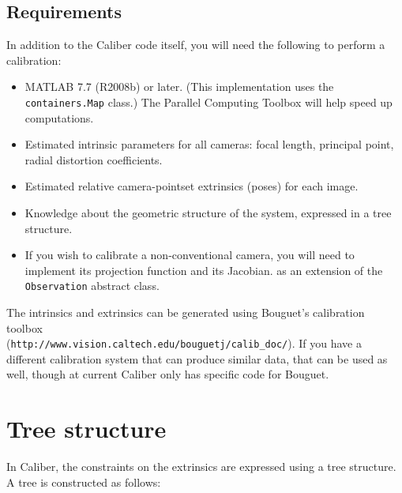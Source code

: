 \subsection{Requirements}
In addition to the Caliber code itself, you will need the following to perform a calibration:
\begin{itemize}
	\item MATLAB 7.7 (R2008b) or later. (This implementation uses the \texttt{containers.Map} class.)
		The Parallel Computing Toolbox will help speed up computations.
	\item Estimated intrinsic parameters for all cameras: 
		focal length, principal point, radial distortion coefficients.
	\item Estimated relative camera-pointset extrinsics (poses) for each image.
	\item Knowledge about the geometric structure of the system, expressed in a tree structure.
	\item If you wish to calibrate a non-conventional camera, you will need to implement its
		projection function and its Jacobian.
		as an extension of the \texttt{Observation} abstract class.
\end{itemize}
The intrinsics and extrinsics can be generated using Bouguet's calibration toolbox \\
(\texttt{http://www.vision.caltech.edu/bouguetj/calib\_doc/}). If you have a different calibration system
that can produce similar data, that can be used as well, though at current Caliber only has specific code
for Bouguet.

\section{Tree structure}

In Caliber, the constraints on the extrinsics are expressed using a tree structure. A tree
is constructed as follows:

